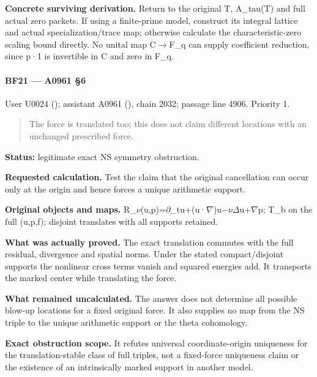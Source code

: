 \textbf{Concrete surviving derivation.} Return to the original T,
A\_tau(T) and full actual zero packets. If using a finite-prime model,
construct its integral lattice and actual specialization/trace map;
otherwise calculate the characteristic-zero scaling bound directly. No
unital map C\allowbreak{}\ensuremath{→}\allowbreak{}F\_q can supply
coefficient reduction, since p·1 is invertible in C and zero in F\_q.

\paragraph{BF21 --- A0961 §6}\label{bf21-a0961-6}

User U0024 (\protect{});
assistant A0961 (\protect{}),
chain 2032; passage line 4906. Priority 1.

\begin{quote}
The force is translated too; this does not claim different locations
with an unchanged prescribed force.
\end{quote}

\textbf{Status:} legitimate exact NS symmetry obstruction.

\textbf{Requested calculation.} Test the claim that the original
cancellation can occur only at the origin and hence forces a unique
arithmetic support.

\textbf{Original objects and maps.}
R\_\allowbreak{}\ensuremath{ν}\allowbreak{}(u,p)=\allowbreak{}\ensuremath{∂}\allowbreak{}\_tu+(u·\allowbreak{}\ensuremath{∇}\allowbreak{})u\allowbreak{}\ensuremath{−}\allowbreak{}\allowbreak{}\ensuremath{ν}\allowbreak{}\allowbreak{}\ensuremath{Δ}\allowbreak{}u+\allowbreak{}\ensuremath{∇}\allowbreak{}p;
T\_b on the full (u,p,f); disjoint translates with all supports
retained.

\textbf{What was actually proved.} The exact translation commutes with
the full residual, divergence and spatial norms. Under the stated
compact/disjoint supports the nonlinear cross terms vanish and squared
energies add. It transports the marked center while translating the
force.

\textbf{What remained uncalculated.} The answer does not determine all
possible blow-up locations for a fixed original force. It also supplies
no map from the NS triple to the unique arithmetic support or the theta
cohomology.

\textbf{Exact obstruction scope.} It refutes universal coordinate-origin
uniqueness for the translation-stable class of full triples, not a
fixed-force uniqueness claim or the existence of an intrinsically marked
support in another model.


